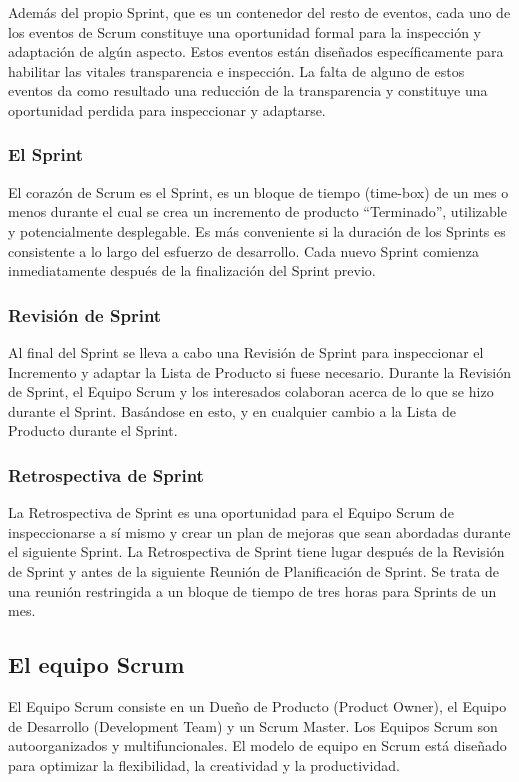   Además del propio Sprint, que es un contenedor del resto de eventos, cada uno de los eventos de Scrum constituye una oportunidad formal para la inspección y adaptación de algún aspecto. Estos eventos están diseñados específicamente para habilitar las vitales transparencia e inspección. La falta de alguno de estos eventos da como resultado una reducción de la transparencia y constituye una oportunidad perdida para inspeccionar y adaptarse.
  
  \subsubsection{El Sprint}
  El corazón de Scrum es el Sprint, es un bloque de tiempo (time-box) de un mes o menos durante el cual se crea un incremento de producto “Terminado”, utilizable y potencialmente desplegable. Es más conveniente si la duración de los Sprints es consistente a lo largo del esfuerzo de desarrollo. Cada nuevo Sprint comienza inmediatamente después de la finalización del Sprint previo.
  
  \subsubsection{Revisión de Sprint}
  Al final del Sprint se lleva a cabo una Revisión de Sprint para inspeccionar el Incremento y adaptar la Lista de Producto si fuese necesario. Durante la Revisión de Sprint, el Equipo Scrum y los interesados colaboran acerca de lo que se hizo durante el Sprint. Basándose en esto, y en cualquier cambio a la Lista de Producto durante el Sprint.
  
  \subsubsection{Retrospectiva de Sprint}
  La Retrospectiva de Sprint es una oportunidad para el Equipo Scrum de inspeccionarse a sí mismo y crear un plan de mejoras que sean abordadas durante el siguiente Sprint. La Retrospectiva de Sprint tiene lugar después de la Revisión de Sprint y antes de la siguiente Reunión de Planificación de Sprint. Se trata de una reunión restringida a un bloque de tiempo de tres horas para Sprints de un mes.
  
  \subsection{El equipo Scrum}
  El Equipo Scrum consiste en un Dueño de Producto (Product Owner), el Equipo de Desarrollo (Development Team) y un Scrum Master. Los Equipos Scrum son autoorganizados y multifuncionales. El modelo de equipo en Scrum está diseñado para optimizar la flexibilidad, la creatividad y la productividad. \\
  
